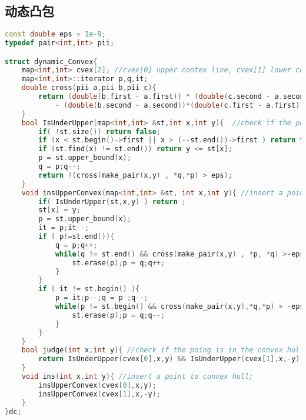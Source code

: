 \subsection{动态凸包}
		\begin{lstlisting}[language=c++]
const double eps = 1e-9;
typedef pair<int,int> pii;

struct dynamic_Convex{
	map<int,int> cvex[2]; //cvex[0] upper contex line, cvex[1] lower convex line
	map<int,int>::iterator p,q,it;
	double cross(pii a,pii b,pii c){
		return (double(b.first - a.first)) * (double(c.second - a.second))
			- (double(b.second - a.second))*(double(c.first - a.first));
	}
	bool IsUnderUpper(map<int,int> &st,int x,int y){  //check if the point is under the upper convex line
		if( !st.size()) return false;
		if (x < st.begin()->first || x > (--st.end())->first ) return false;
		if (st.find(x) != st.end()) return y <= st[x]; 
		p = st.upper_bound(x);
		q = p;q--;
		return !(cross(make_pair(x,y) , *q,*p) > eps);
	}
	void insUpperConvex(map<int,int> &st, int x,int y){ //insert a point to upper convex line
		if( IsUnderUpper(st,x,y) ) return ;
		st[x] = y;
		p = st.upper_bound(x);
		it = p;it--;
		if ( p!=st.end()){
			q = p;q++;
			while(q != st.end() && cross(make_pair(x,y) , *p, *q) >-eps ){
				st.erase(p);p = q;q++;
			}
		}
		if ( it != st.begin() ){
			p = it;p--;q = p ;q--;
			while(p != st.begin() && cross(make_pair(x,y),*q,*p) > -eps){
				st.erase(p);p = q;q--;
			}
		}
	}
	bool judge(int x,int y){ //check if the poing is in the convex hull
		return IsUnderUpper(cvex[0],x,y) && IsUnderUpper(cvex[1],x,-y);
	}
	void ins(int x,int y){ //insert a point to convex hull;
		insUpperConvex(cvex[0],x,y);
		insUpperConvex(cvex[1],x,-y);
	}
}dc;
	\end{lstlisting}
